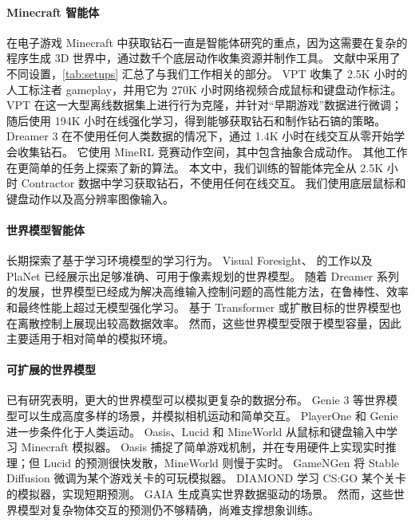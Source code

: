 \documentclass[11pt]{article}
\begin{document}
\paragraph{Minecraft 智能体}

在电子游戏 Minecraft 中获取钻石一直是智能体研究的重点\citep{johnson2016malmo,guss2019minerl,kanervisto2022minerlcomp,kanitscheider2021minecraftcurriculum}，因为这需要在复杂的程序生成 3D 世界中，通过数千个底层动作收集资源并制作工具。
文献中采用了不同设置，\cref{tab:setups} 汇总了与我们工作相关的部分。
VPT\citep{vpt} 收集了 2.5K 小时的人工标注者 gameplay，并用它为 270K 小时网络视频合成鼠标和键盘动作标注。
VPT 在这一大型离线数据集上进行行为克隆，并针对“早期游戏”数据进行微调；
随后使用 194K 小时在线强化学习，得到能够获取钻石和制作钻石镐的策略。
Dreamer 3 \citep{dreamerv3} 在不使用任何人类数据的情况下，通过 1.4K 小时在线交互从零开始学会收集钻石。
它使用 MineRL 竞赛动作空间，其中包含抽象合成动作。
其他工作在更简单的任务上探索了新的算法\citep{lifshitz2023steve1,cai2023minecraftgroot,zhou2024minedreamer,nieto2021minecraftskills}。
本文中，我们训练的智能体完全从 2.5K 小时 Contractor 数据中学习获取钻石，不使用任何在线交互。
我们使用底层鼠标和键盘动作以及高分辨率图像输入。

\paragraph{世界模型智能体}

长期探索了基于学习环境模型的学习行为\citep{sutton1991dyna,deisenroth2011pilco,watter2015e2c}。
Visual Foresight\citep{finn2017visualforesight}、\citet{ha2018worldmodels} 的工作以及 PlaNet\citep{hafner2018planet} 已经展示出足够准确、可用于像素规划的世界模型。
随着 Dreamer 系列的发展，世界模型已经成为解决高维输入控制问题的高性能方法，在鲁棒性、效率和最终性能上超过无模型强化学习\citep{hafner2019dreamer,hafner2020dreamerv2,dreamerv3}。
基于 Transformer 或扩散目标的世界模型也在离散控制上展现出较高数据效率\citep{micheli2022iris,robine2023twm,storm}。
然而，这些世界模型受限于模型容量，因此主要适用于相对简单的模拟环境。

\paragraph{可扩展的世界模型}

已有研究表明，更大的世界模型可以模拟更复杂的数据分布\citep{yu2025survey}。
Genie 3 等世界模型可以生成高度多样的场景，并模拟相机运动和简单交互\citep{genie3,he2025matrix,sun2025virtual,team2025yan}。
PlayerOne\citep{tu2025playerone} 和 Genie\citep{bai2025whole} 进一步条件化于人类运动。
Oasis\citep{oasis}、Lucid\citep{lucidv1} 和 MineWorld\cite{mineworld} 从鼠标和键盘输入中学习 Minecraft 模拟器。
Oasis 捕捉了简单游戏机制，并在专用硬件上实现实时推理；但 Lucid 的预测很快发散，MineWorld 则慢于实时。
GameNGen\citep{valevski2024diffusion} 将 Stable Diffusion 微调为某个游戏关卡的可玩模拟器。
DIAMOND\citep{alonso2024diffusion} 学习 CS:GO 某个关卡的模拟器，实现短期预测。
GAIA\citep{hu2023gaia,russell2025gaia} 生成真实世界数据驱动的场景。
然而，这些世界模型对复杂物体交互的预测仍不够精确，尚难支撑想象训练。
\end{document}
